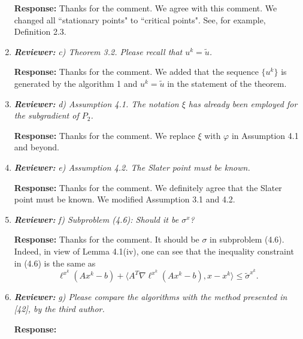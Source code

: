 \documentclass{article}
\begin{document}
\begin{enumerate}
	\textbf{Response:} Thanks for the comment. We agree with this comment. We changed all ``stationary points" to ``critical points". See, for example, Definition 2.3.
	
	\item  \textit{\textbf{Reviewer:}} \textit{ c) Theorem 3.2. Please recall that $u^k = \tilde u$.}
	
	\textbf{Response:} Thanks for the comment. We added that the sequence $\{u^k\}$ is generated by the algorithm 1 and $u^k = \tilde u$ in the statement of the theorem.

	\item \textit{\textbf{Reviewer:}} \textit{ d) Assumption 4.1. The notation $\xi$ has already been employed for the subgradient of $P_2$.}

    \textbf{Response:} Thanks for the comment. We replace $\xi$ with $\varphi$ in Assumption 4.1 and beyond.

	\item \textit{\textbf{Reviewer:}} \textit{ e) Assumption 4.2. The Slater point must be known.}

    \textbf{Response:} Thanks for the comment. We definitely agree that the Slater point must be known. We modified Assumption 3.1 and 4.2.

	\item \textit{\textbf{Reviewer:}} \textit{ f) Subproblem (4.6): Should it be $\sigma^x$?}

    \textbf{Response:} Thanks for the comment. It should be $\sigma$ in subproblem (4.6). Indeed, in view of Lemma 4.1(iv), one can see that the inequality constraint in (4.6) is the same as
    \[
    \ell^{x^k}(Ax^k - b) + \langle A^T\nabla \ell^{x^k}(Ax^k - b),x-x^k\rangle \le \tilde \sigma^{x^k}.
    \]

	\item \textit{\textbf{Reviewer:}} \textit{ g) Please compare the algorithms with the method presented in [42], by the third author.}

    \textbf{Response:} {\color{red}{Unanswered.}}
\end{enumerate}
\end{document}
